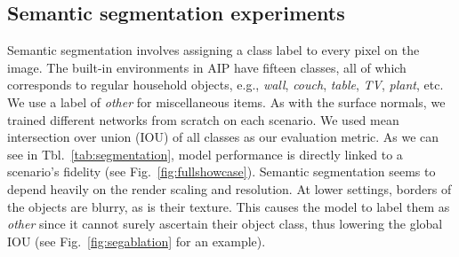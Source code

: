 \documentclass[runningheads]{llncs}
\begin{document}
\subsection{Semantic segmentation experiments}
Semantic segmentation involves assigning a class label to every pixel on the image. The built-in environments in AIP have fifteen classes, all of which corresponds to regular household objects, e.g., \textit{wall}, \textit{couch}, \textit{table}, \textit{TV}, \textit{plant}, etc. We use a label of \textit{other} for miscellaneous items. As with the surface normals, we trained different networks from scratch on each scenario. We used mean intersection over union (IOU) of all classes as our evaluation metric. As we can see in Tbl.~\ref{tab:segmentation}, model performance is directly linked to a scenario's fidelity (see Fig.~\ref{fig:fullshowcase}). Semantic segmentation seems to depend heavily on the render scaling and resolution. At lower settings, borders of the objects are blurry, as is their texture. This causes the model to label them as \textit{other} since it cannot surely ascertain their object class, thus lowering the global IOU (see Fig.~\ref{fig:segablation} for an example).
\end{document}

